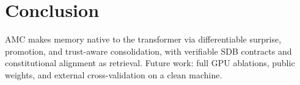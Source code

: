 \section{Conclusion}
\label{sec:conclusion}

AMC makes memory native to the transformer via differentiable surprise,
promotion, and trust-aware consolidation, with verifiable SDB contracts
and constitutional alignment as retrieval. Future work: full GPU ablations,
public weights, and external cross-validation on a clean machine.
